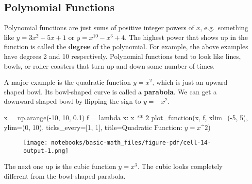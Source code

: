\documentclass[
  letterpaper,
  DIV=11,
  numbers=noendperiod]{scrreprt}
\newenvironment{Shaded}{\begin{snugshade}}{\end{snugshade}}
\newcommand{\DecValTok}[1]{\textcolor[rgb]{0.68,0.00,0.00}{#1}}
\newcommand{\FloatTok}[1]{\textcolor[rgb]{0.68,0.00,0.00}{#1}}
\newcommand{\KeywordTok}[1]{\textcolor[rgb]{0.00,0.23,0.31}{#1}}
\newcommand{\NormalTok}[1]{\textcolor[rgb]{0.00,0.23,0.31}{#1}}
\newcommand{\OperatorTok}[1]{\textcolor[rgb]{0.37,0.37,0.37}{#1}}
\newcommand{\StringTok}[1]{\textcolor[rgb]{0.13,0.47,0.30}{#1}}
\begin{document}
\hypertarget{polynomial-functions}{%
\subsection{Polynomial Functions}\label{polynomial-functions}}

Polynomial functions are just sums of positive integer powers of \(x\),
e.g.~something like \(y=3x^2+5x+1\) or \(y=x^{10}-x^{3}+4\). The highest
power that shows up in the function is called the \textbf{degree} of the
polynomial. For example, the above examples have degrees 2 and 10
respectively. Polynomial functions tend to look like lines, bowls, or
roller coasters that turn up and down some number of times.

A major example is the quadratic function \(y=x^2\), which is just an
upward-shaped bowl. Its bowl-shaped curve is called a \textbf{parabola}.
We can get a downward-shaped bowl by flipping the sign to \(y=-x^2\).

\begin{Shaded}
\begin{Highlighting}[]
\NormalTok{x }\OperatorTok{=}\NormalTok{ np.arange(}\OperatorTok{{-}}\DecValTok{10}\NormalTok{, }\DecValTok{10}\NormalTok{, }\FloatTok{0.1}\NormalTok{)}
\NormalTok{f }\OperatorTok{=} \KeywordTok{lambda}\NormalTok{ x: x }\OperatorTok{**} \DecValTok{2}
\NormalTok{plot\_function(x, f, xlim}\OperatorTok{=}\NormalTok{(}\OperatorTok{{-}}\DecValTok{5}\NormalTok{, }\DecValTok{5}\NormalTok{), ylim}\OperatorTok{=}\NormalTok{(}\DecValTok{0}\NormalTok{, }\DecValTok{10}\NormalTok{), ticks\_every}\OperatorTok{=}\NormalTok{[}\DecValTok{1}\NormalTok{, }\DecValTok{1}\NormalTok{], }
\NormalTok{              title}\OperatorTok{=}\StringTok{\textquotesingle{}Quadratic Function: $y=x\^{}2$\textquotesingle{}}\NormalTok{)}
\end{Highlighting}
\end{Shaded}

\begin{figure}[H]

{\centering \texttt{[image: notebooks/basic-math\_files/figure-pdf/cell-14-output-1.png]}

}

\end{figure}

The next one up is the cubic function \(y=x^3\). The cubic looks
completely different from the bowl-shaped parabola.
\end{document}
